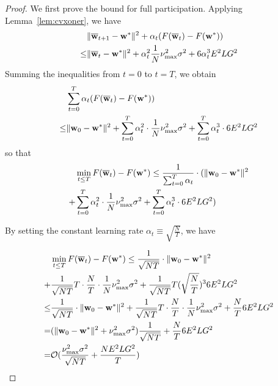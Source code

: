 \begin{proof}
	We first prove the bound for full participation. Applying Lemma~\ref{lem:cvxoner}, we have
	\begin{align*}
	&\|{\overline{\mathbf{w}}}_{t+1}-{\mathbf{w}}^{\ast}\|^{2}+\alpha_{t}(F({\overline{\mathbf{w}}}_{t})-F({\mathbf{w}}^{\ast}))\\
	\leq&\|{\overline{\mathbf{w}}}_{t}-{\mathbf{w}}^{\ast}\|^{2}
	+\alpha_{t}^{2}\frac{1}{N}\nu_{\max}^{2}\sigma^{2}+6\alpha_{t}^{3}E^{2}LG^{2}
	\end{align*}
	Summing the inequalities from $t=0$ to $t=T$, we obtain 
	\begin{align*}
	&\sum_{t=0}^{T}\alpha_{t}(F({\overline{\mathbf{w}}}_{t})-F({\mathbf{w}}^{\ast})) \\ 
	\leq & \|{\mathbf{w}}_{0}-{\mathbf{w}}^{\ast}\|^{2}+\sum_{t=0}^{T}\alpha_{t}^{2}\cdot\frac{1}{N}\nu_{\max}^{2}\sigma^{2}+\sum_{t=0}^{T}\alpha_{t}^{3}\cdot6E^{2}LG^{2}
	\end{align*}
	so that
 \begin{align*}
	& \min_{t\leq T}F({\overline{\mathbf{w}}}_{t})-F({\mathbf{w}}^{\ast}) \leq \frac{1}{\sum_{t=0}^{T}\alpha_{t}} \cdot (\|{\mathbf{w}}_{0}-{\mathbf{w}}^{\ast}\|^{2}\\
	+&\sum_{t=0}^{T}\alpha_{t}^{2}\cdot\frac{1}{N}\nu_{\max}^{2}\sigma^{2}+\sum_{t=0}^{T}\alpha_{t}^{3}\cdot6E^{2}LG^{2})
	\end{align*}
	
	By setting the constant learning rate $\alpha_{t}\equiv\sqrt{\frac{N}{T}}$,
	we have 
	
\begin{align*}
&\min_{t\leq T}F({\overline{\mathbf{w}}}_{t})-F({\mathbf{w}}^{\ast})  \leq\frac{1}{\sqrt{NT}}\cdot\|{\mathbf{w}}_{0}-{\mathbf{w}}^{\ast}\|^{2}\\
+&\frac{1}{\sqrt{NT}}T\cdot\frac{N}{T}\cdot\frac{1}{N}\nu_{\max}^{2}\sigma^{2}+\frac{1}{\sqrt{NT}}T(\sqrt{\frac{N}{T}})^{3}6E^{2}LG^{2}\\
 \leq&\frac{1}{\sqrt{NT}}\cdot\|{\mathbf{w}}_{0}-{\mathbf{w}}^{\ast}\|^{2}+\frac{1}{\sqrt{NT}}T\cdot\frac{N}{T}\cdot\frac{1}{N}\nu_{\max}^{2}\sigma^{2}+\frac{N}{T}6E^{2}LG^{2}\\
 =&(\|{\mathbf{w}}_{0}-{\mathbf{w}}^{\ast}\|^{2}+\nu_{\max}^{2}\sigma^{2})\frac{1}{\sqrt{NT}}+\frac{N}{T}6E^{2}LG^{2}\\
 =&\mathcal{O}(\frac{\nu_{\max}^{2}\sigma^{2}}{\sqrt{NT}}+\frac{NE^{2}LG^{2}}{T})
\end{align*}
	

\end{proof}
